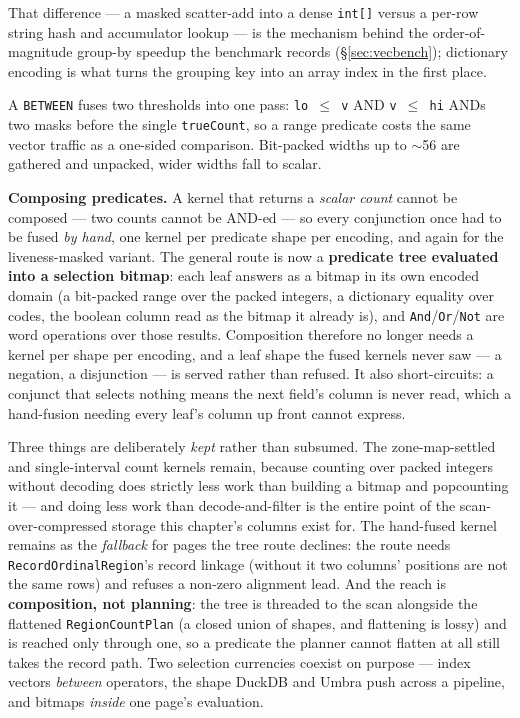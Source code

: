 \documentclass[11pt,a4paper,oneside]{report}
\theoremstyle{sirixthm}
\newcommand{\code}[1]{\texttt{#1}}
\begin{document}
\noindent That difference --- a masked scatter-add into a dense \code{int[]} versus a per-row string hash
and accumulator lookup --- is the mechanism behind the order-of-magnitude group-by speedup the benchmark
records (\S\ref{sec:vecbench}); dictionary encoding is what turns the grouping key into an array index in
the first place.

A \code{BETWEEN} fuses two thresholds into one pass: \code{lo $\le$ v} AND \code{v $\le$ hi} ANDs two
masks before the single \code{trueCount}, so a range predicate costs the same vector traffic as a
one-sided comparison. Bit-packed widths up to $\sim$56 are gathered and unpacked, wider widths fall
to scalar.

\noindent \textbf{Composing predicates.} A kernel that returns a \emph{scalar count} cannot be
composed --- two counts cannot be AND-ed --- so every conjunction once had to be fused \emph{by
hand}, one kernel per predicate shape per encoding, and again for the liveness-masked variant. The
general route is now a \textbf{predicate tree evaluated into a selection bitmap}: each leaf answers
as a bitmap in its own encoded domain (a bit-packed range over the packed integers, a dictionary
equality over codes, the boolean column read as the bitmap it already is), and
\code{And}/\code{Or}/\code{Not} are word operations over those results. Composition therefore no
longer needs a kernel per shape per encoding, and a leaf shape the fused kernels never saw --- a
negation, a disjunction --- is served rather than refused. It also short-circuits: a conjunct that
selects nothing means the next field's column is never read, which a hand-fusion needing every leaf's
column up front cannot express.

Three things are deliberately \emph{kept} rather than subsumed. The zone-map-settled and
single-interval count kernels remain, because counting over packed integers without decoding does
strictly less work than building a bitmap and popcounting it --- and doing less work than
decode-and-filter is the entire point of the scan-over-compressed storage this chapter's columns
exist for. The hand-fused kernel remains as the \emph{fallback} for pages the tree route declines:
the route needs \code{RecordOrdinalRegion}'s record linkage (without it two columns' positions are
not the same rows) and refuses a non-zero alignment lead.
And the reach is \textbf{composition, not planning}: the tree is threaded to the scan alongside the
flattened \code{RegionCountPlan} (a closed union of shapes, and flattening is lossy) and is reached
only through one, so a predicate the planner cannot flatten at all still takes the record path.
Two selection currencies coexist on purpose --- index vectors \emph{between} operators, the shape
DuckDB and Umbra push across a pipeline, and bitmaps \emph{inside} one page's evaluation.
\end{document}
